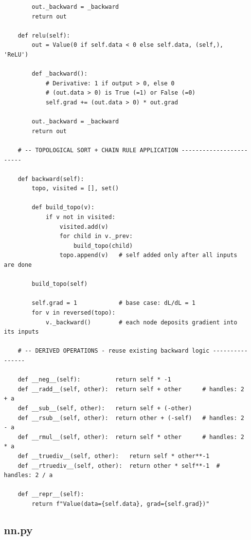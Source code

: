 \documentclass[12pt,a4paper]{article}
\begin{document}
\begin{lstlisting}
        out._backward = _backward
        return out

    def relu(self):
        out = Value(0 if self.data < 0 else self.data, (self,), 'ReLU')

        def _backward():
            # Derivative: 1 if output > 0, else 0
            # (out.data > 0) is True (=1) or False (=0)
            self.grad += (out.data > 0) * out.grad

        out._backward = _backward
        return out

    # -- TOPOLOGICAL SORT + CHAIN RULE APPLICATION ------------------------

    def backward(self):
        topo, visited = [], set()

        def build_topo(v):
            if v not in visited:
                visited.add(v)
                for child in v._prev:
                    build_topo(child)
                topo.append(v)   # self added only after all inputs are done

        build_topo(self)

        self.grad = 1            # base case: dL/dL = 1
        for v in reversed(topo):
            v._backward()        # each node deposits gradient into its inputs

    # -- DERIVED OPERATIONS - reuse existing backward logic ----------------

    def __neg__(self):          return self * -1
    def __radd__(self, other):  return self + other      # handles: 2 + a
    def __sub__(self, other):   return self + (-other)
    def __rsub__(self, other):  return other + (-self)   # handles: 2 - a
    def __rmul__(self, other):  return self * other      # handles: 2 * a
    def __truediv__(self, other):   return self * other**-1
    def __rtruediv__(self, other):  return other * self**-1  # handles: 2 / a

    def __repr__(self):
        return f"Value(data={self.data}, grad={self.grad})"
\end{lstlisting}

\subsection{nn.py}
\end{document}
